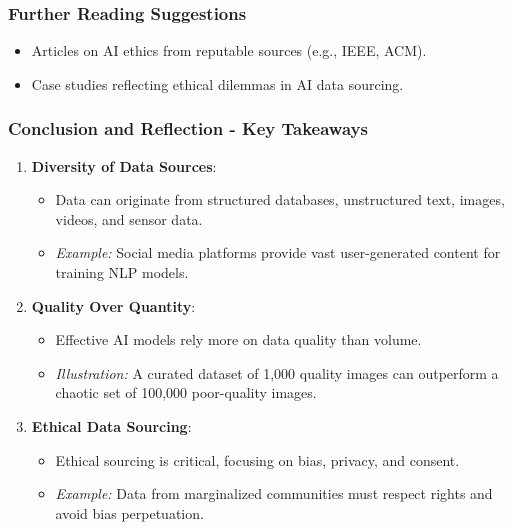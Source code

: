 \documentclass[aspectratio=169]{beamer}
\begin{document}
\begin{frame}[fragile]
    \frametitle{Further Reading Suggestions}
    \begin{itemize}
        \item Articles on AI ethics from reputable sources (e.g., IEEE, ACM).
        \item Case studies reflecting ethical dilemmas in AI data sourcing.
    \end{itemize}
\end{frame}

\begin{frame}[fragile]
    \frametitle{Conclusion and Reflection - Key Takeaways}
    \begin{enumerate}
        \item \textbf{Diversity of Data Sources}:
        \begin{itemize}
            \item Data can originate from structured databases, unstructured text, images, videos, and sensor data.
            \item \textit{Example:} Social media platforms provide vast user-generated content for training NLP models.
        \end{itemize}
        
        \item \textbf{Quality Over Quantity}:
        \begin{itemize}
            \item Effective AI models rely more on data quality than volume.
            \item \textit{Illustration:} A curated dataset of 1,000 quality images can outperform a chaotic set of 100,000 poor-quality images.
        \end{itemize}

        \item \textbf{Ethical Data Sourcing}:
        \begin{itemize}
            \item Ethical sourcing is critical, focusing on bias, privacy, and consent.
            \item \textit{Example:} Data from marginalized communities must respect rights and avoid bias perpetuation.
        \end{itemize}
    \end{enumerate}
\end{frame}
\end{document}
